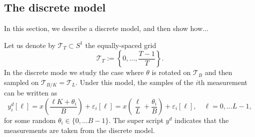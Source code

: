 \documentclass[english,12pt]{article}
\newcommand{\I}{\iota}
\newcommand{\tB}{B_w}
\newcommand{\T}{\mathcal{T}}
\numberwithin{equation}{section}
\numberwithin{thm}{section} %
\begin{document}

\subsection{The discrete model} \label{sec:discrete_analysis}

In this section, we describe a discrete model, and then show how... 

Let us denote by $\T_T\subset S^1$ the equally-spaced grid 
 \begin{equation} \label{eq:grid}
 \mathcal{T}_T:=\left\{0,\ldots,\frac{T-1}{T}\right\}.
 \end{equation}
 In the discrete mode we study the case where $\theta$ is rotated on $\T_B$ and then sampled on $\T_{B/K}=\T_{L}$.
 Under this model, the samples of the $i$th measurement can be  written as
 \begin{equation} \label{eq:discrete_model}
 y_i^d[\ell] = x\left(\frac{\ell K+\theta_i}{B}\right) + \varepsilon_i[\ell]=x\left(\frac{\ell}{L} + \frac{\theta_i}{B}\right)+\varepsilon_i[\ell], \quad \ell=0,\ldots L-1,
 \end{equation}
 for some random $\theta_i\in\{0,\ldots B-1\}$. The super script $y^d$ indicates that the measurements are taken from the discrete model. 
 
\end{document}
